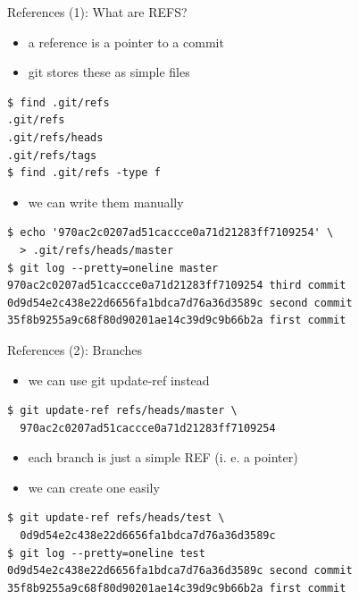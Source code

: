 \begin{frame}[fragile]{References (1): What are REFS?}
  \begin{itemize}
    \item a reference is a pointer to a commit
    \item git stores these as simple files
  \end{itemize}

\begin{lstlisting}[style=ShellCmd]
$ find .git/refs
.git/refs
.git/refs/heads
.git/refs/tags
$ find .git/refs -type f
\end{lstlisting}
  \begin{itemize}
    \item we can write them manually
  \end{itemize}
\begin{lstlisting}[style=ShellCmd]
$ echo '970ac2c0207ad51caccce0a71d21283ff7109254' \
  > .git/refs/heads/master
$ git log --pretty=oneline master
970ac2c0207ad51caccce0a71d21283ff7109254 third commit
0d9d54e2c438e22d6656fa1bdca7d76a36d3589c second commit
35f8b9255a9c68f80d90201ae14c39d9c9b66b2a first commit
\end{lstlisting}
\end{frame}

\begin{frame}[fragile]{References (2): Branches}
  \begin{itemize}
    \item we can use git update-ref instead
  \end{itemize}

\begin{lstlisting}[style=ShellCmd]
$ git update-ref refs/heads/master \
  970ac2c0207ad51caccce0a71d21283ff7109254
\end{lstlisting}

  \begin{itemize}
    \item each branch is just a simple REF (i. e. a pointer)
    \item we can create one easily
  \end{itemize}
\begin{lstlisting}[style=ShellCmd]
$ git update-ref refs/heads/test \
  0d9d54e2c438e22d6656fa1bdca7d76a36d3589c
$ git log --pretty=oneline test
0d9d54e2c438e22d6656fa1bdca7d76a36d3589c second commit
35f8b9255a9c68f80d90201ae14c39d9c9b66b2a first commit
\end{lstlisting}
\end{frame}


